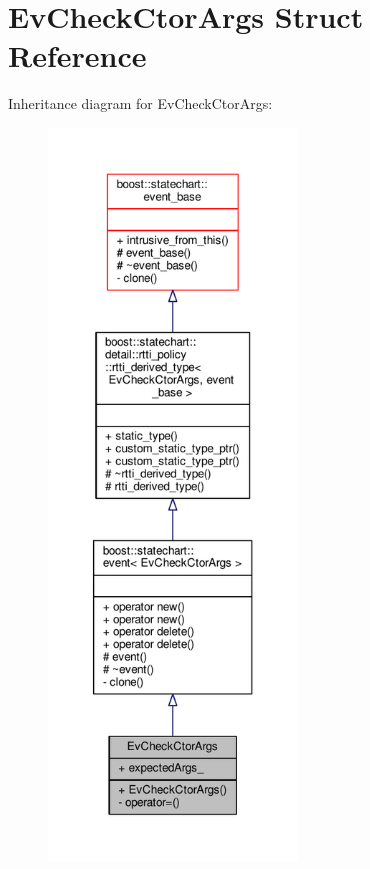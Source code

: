 \hypertarget{struct_ev_check_ctor_args}{}\section{Ev\+Check\+Ctor\+Args Struct Reference}
\label{struct_ev_check_ctor_args}


Inheritance diagram for Ev\+Check\+Ctor\+Args\+:
\nopagebreak
\begin{figure}[H]
\begin{center}
\leavevmode
\includegraphics[height=550pt]{struct_ev_check_ctor_args__inherit__graph}
\end{center}
\end{figure}



